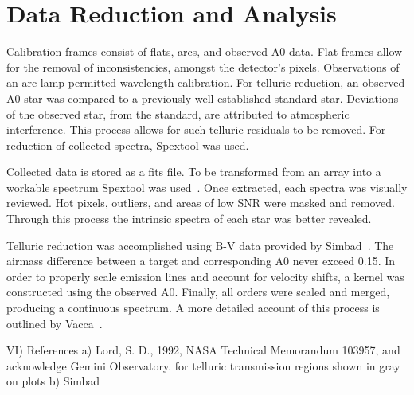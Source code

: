\section{Data Reduction and Analysis}

Calibration frames consist of flats, arcs, and observed A0 data.  Flat frames allow for the removal of inconsistencies, amongst the detector's pixels.  Observations of an arc lamp permitted wavelength calibration.  For telluric reduction, an observed A0 star was compared to a previously well established standard star.  Deviations of the observed star, from the standard, are attributed to atmospheric interference.  This process allows for such telluric residuals to be removed.  For reduction of collected spectra, Spextool was used.


Collected data is stored as a fits file.  To be transformed from an array into a workable spectrum Spextool was used~\cite{Cushing_2004}.  Once extracted, each spectra was visually reviewed.  Hot pixels, outliers, and areas of low SNR were masked and removed.  Through this process the intrinsic spectra of each star was better revealed.


Telluric reduction was accomplished using B-V data provided by Simbad~\cite{simbad}.  The airmass difference between a target and corresponding A0 never exceed 0.15.  
In order to properly scale emission lines and account for velocity shifts, a kernel was constructed using the observed A0.  Finally, all orders were scaled and merged, producing a continuous spectrum.
A more detailed account of this process is outlined by Vacca~\cite{Vacca_2003}. 



VI) References
  a) Lord, S. D., 1992, NASA Technical Memorandum 103957, and acknowledge Gemini Observatory.
  for telluric transmission regions shown in gray on plots
  b) Simbad
  
  
  
  



